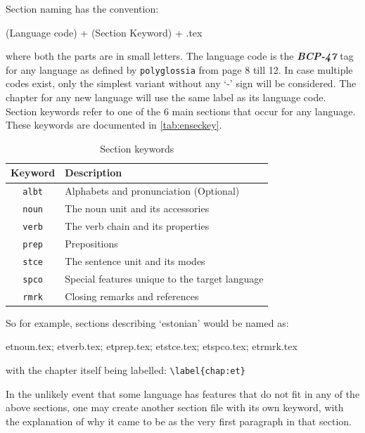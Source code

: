 \documentclass[12pt,twoside]{article}
\newcommand*{\bt}[1]{\textbf{#1}}
\newenvironment{example}{\def\FrameCommand{\colorbox{sampler}} \MakeFramed{\advance\hsize+\width}\begin{center}}{\end{center}\endMakeFramed}
\newenvironment{syntax}{\def\FrameCommand{\colorbox{ruler}} \MakeFramed{\advance\hsize+\width}\begin{center}}{\end{center}\endMakeFramed}
\begin{document}
Section naming has the convention:
\begin{syntax}
    (Language code) + (Section Keyword) + .tex
\end{syntax}
where both the parts are in small letters. The language code is the \bt{\textit{BCP-47}} tag for any language as defined by \texttt{polyglossia} from page 8 till 12. In case multiple codes exist, only the simplest variant without any `-' sign will be considered. The chapter for any new language will use the same label as its language  code. Section keywords refer to one of the $6$ main sections that occur for any language. These keywords are documented in \autoref{tab:enseckey}.
\begin{table}[bth]
    \centering
    \begin{tabular}{|c|m{8cm}|}
        \hline \bt{Keyword} & \bt{Description}\\\hline
        \texttt{albt} & Alphabets and pronunciation (Optional)\\\hline
        \texttt{noun} & The noun unit and its accessories\\\hline
        \texttt{verb} & The verb chain and its properties\\\hline
        \texttt{prep} & Prepositions\\\hline
        \texttt{stce} & The sentence unit and its modes\\\hline
        \texttt{spco} & Special features unique to the target language\\\hline
        \texttt{rmrk} & Closing remarks and references\\\hline
    \end{tabular}
    \caption{Section keywords}
    \label{tab:enseckey}
\end{table}

So for example,  sections describing  `estonian' would be named as:
\begin{example}
etnoun.tex; etverb.tex; etprep.tex; etstce.tex; etspco.tex; etrmrk.tex
\end{example}
with the chapter itself being labelled: \verb|\label{chap:et}|

In the unlikely event that some language has features that do not fit in any of the above sections, one may create another section file with its own keyword, with the explanation of why it came to be as the very first paragraph in that section.
\end{document}
